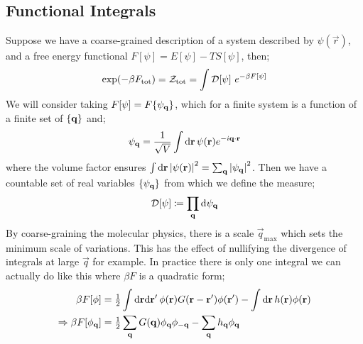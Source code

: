 \subsection{Functional Integrals}
Suppose we have a coarse-grained description of a system described by $\psi(\vec r)$, and a free energy functional $F[\psi] = E[\psi] - TS[\psi]$, then;
\begin{equation}
\exp(-\beta F_{\text{tot}}) = \mathcal{Z}_{\text{tot}} = \int{\mathcal{D}[\psi]\,\,e^{-\beta F[\psi]}}
\end{equation}
We will consider taking $F[\psi] = F\set{\psi_{\vec{q}}}$, which for a finite system is a function of a finite set of $\set{\vec{q}}$ and;
\begin{equation}
\psi_{\mathbf{q}} = \frac{1}{\sqrt{V}}\int{\text{d}\mathbf r \,\psi(\mathbf r)e^{-i\mathbf{q}\cdot\mathbf{r}}}
\end{equation}
where the volume factor ensures $\int{\upd{\vec r}\abs{\psi(\vec{r})}^2} = \sum_{\vec{q}}{\abs{\psi_{\vec{q}}}^2}$. Then we have a countable set of real variables $\set{\psi_{\vec{q}}}$ from which we define the measure;
\begin{equation}
\mathcal{D}[\psi] \coloneqq \prod_{\mathbf{q}}{\text{d} \psi_{\mathbf{q}}}
\end{equation}
By coarse-graining the molecular physics, there is a scale $\vec{q}_{\text{max}}$ which sets the minimum scale of variations. This has the effect of nullifying the divergence of integrals at large $\vec{q}$ for example. In practice there is only one integral we can actually do like this where $\beta F$ is a quadratic form;\footnotemark
{}
\begin{align}
\beta F[\phi] &= \tfrac{1}{2}\int{\text{d}\mathbf{r}\text{d}\mathbf{r}^{\prime}\,\phi(\mathbf{r})G(\mathbf{r} - \mathbf{r}^{\prime})\phi(\mathbf{r}^{\prime})} - \int{\text{d}\mathbf{r} \,h(\mathbf{r})\phi(\mathbf{r})} \nonumber \\
\Rightarrow \beta F[\phi_{\mathbf{q}}] &= \tfrac{1}{2}\sum_{\mathbf{q}}{G(\mathbf{q})\phi_{\mathbf{q}}\phi_{-\mathbf{q}}} - \sum_{\mathbf{q}}{h_{\mathbf{q}}\phi_{\mathbf{q}}}
\end{align}
